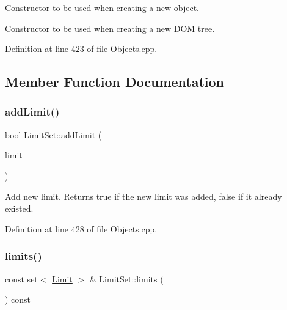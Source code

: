 Constructor to be used when creating a new object. 

Constructor to be used when creating a new D\+OM tree. 

Definition at line 423 of file Objects.\+cpp.



\subsection{Member Function Documentation}
\hypertarget{class_d_d4hep_1_1_geometry_1_1_limit_set_a7cbdab17081174e9a0d1d8ce71246700}{}\label{class_d_d4hep_1_1_geometry_1_1_limit_set_a7cbdab17081174e9a0d1d8ce71246700} 
\subsubsection{\texorpdfstring{add\+Limit()}{addLimit()}}
{\footnotesize\ttfamily bool Limit\+Set\+::add\+Limit (\begin{DoxyParamCaption}\item[{const \hyperlink{class_d_d4hep_1_1_geometry_1_1_limit}{D\+D4hep\+::\+Geometry\+::\+Limit} \&}]{limit }\end{DoxyParamCaption})}



Add new limit. Returns true if the new limit was added, false if it already existed. 



Definition at line 428 of file Objects.\+cpp.

\hypertarget{class_d_d4hep_1_1_geometry_1_1_limit_set_a2a6b24f2aad16e6ca3c55a46db02268b}{}\label{class_d_d4hep_1_1_geometry_1_1_limit_set_a2a6b24f2aad16e6ca3c55a46db02268b} 
\subsubsection{\texorpdfstring{limits()}{limits()}}
{\footnotesize\ttfamily const set$<$ \hyperlink{class_d_d4hep_1_1_geometry_1_1_limit}{Limit} $>$ \& Limit\+Set\+::limits (\begin{DoxyParamCaption}{ }\end{DoxyParamCaption}) const}



